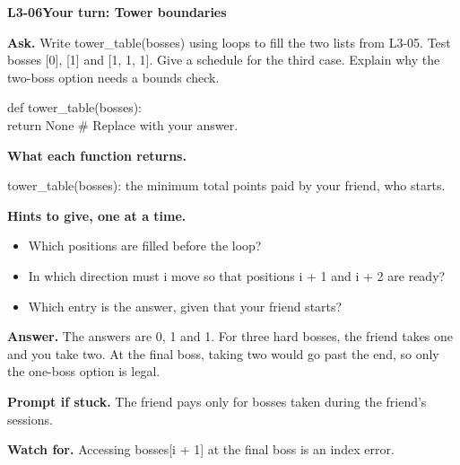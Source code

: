 \documentclass[11pt,a4paper]{article}
\begin{document}
\noindent\begin{minipage}{\textwidth}
{\color{teal}\textbf{L3-06}}\quad \textbf{Your turn: Tower boundaries}\par\smallskip
\textbf{Ask.} Write tower\_table(bosses) using loops to fill the two lists from L3-05. Test bosses [0], [1] and [1, 1, 1]. Give a schedule for the third case. Explain why the two-boss option needs a bounds check.\par\smallskip
\par{}\par\smallskip\noindent\colorbox{codepaper}{\parbox{\dimexpr\linewidth-2\fboxsep\relax}{\small\ttfamily\raggedright def tower\_table(bosses):\\\hspace*{2.4em}return None  \# Replace with your answer.}}\par
{\small\textbf{What each function returns.}\par tower\_table(bosses): the minimum total points paid by your friend, who starts.\par }
{\small\textbf{Hints to give, one at a time.}}\begin{itemize}\item Which positions are filled before the loop?\item In which direction must i move so that positions i + 1 and i + 2 are ready?\item Which entry is the answer, given that your friend starts?\end{itemize}
\textbf{Answer.} The answers are 0, 1 and 1. For three hard bosses, the friend takes one and you take two. At the final boss, taking two would go past the end, so only the one-boss option is legal.\par\smallskip
\textbf{Prompt if stuck.} The friend pays only for bosses taken during the friend's sessions.\par\smallskip
\textbf{Watch for.} Accessing bosses[i + 1] at the final boss is an index error.
\end{minipage}\par{}\medskip
\end{document}
